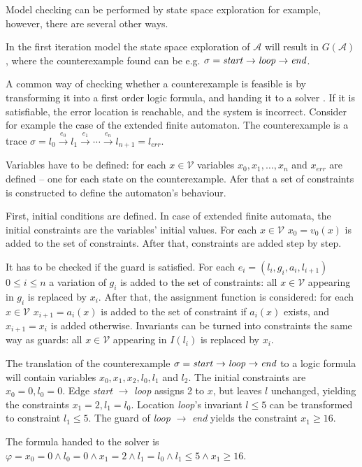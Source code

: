 Model checking can be performed by state space exploration for example, however, there are several other ways.

 \begin{example}
 	In the first iteration model the state space exploration of $\mathcal{A}$ will result in $G(\mathcal{A})$, where the counterexample found can be e.g. $\sigma = \text{\emph{start}} \to \text{\emph{loop}} \to \text{\emph{end}}$.
 \end{example}
 
 A common way of checking whether a counterexample  is feasible is by transforming it into a first order logic formula, and handing it to a solver \cite{BCCZ99}. If it is satisfiable, the error location is reachable, and the system is incorrect. Consider for example the case of the extended finite automaton. The counterexample is a trace $\sigma = l_0 \xrightarrow{e_0} l_1 \xrightarrow{e_1} \cdots \xrightarrow{e_n} l_{n+1}=l_{err}$.

Variables have to be defined: for each $x \in \mathcal{V}$ variables $x_0,x_1, \dots, x_n$ and $x_{err}$ are defined -- one for each state on the counterexample. Afer that a set of constraints is constructed to define the automaton's behaviour. 

First, initial conditions are defined. In case of extended finite automata, the initial constraints are the variables' initial values. For each $x \in \mathcal{V}$ $x_0=v_0(x)$ is added to the set of constraints. After that, constraints are added step by step. 

It has to be checked if the guard is satisfied. For each $e_i=(l_i,g_i,a_i,l_{i+1})$ $0 \leq i \leq n$ a variation of $g_i$ is added to the set of constraints: all $x \in \mathcal{V}$ appearing in $g_i$ is replaced by $x_i$. After that, the assignment function is considered: for each $x \in \mathcal{V}$ $x_{i+1}=a_i(x)$ is added to the set of constraint if $a_i(x)$ exists, and $x_{i+1}=x_i$ is added otherwise. Invariants can be turned into constraints the same way as guards: all $x \in \mathcal{V}$ appearing in $I(l_i)$ is replaced by $x_i$. 

\begin{example}
	The translation of the counterexample $\sigma = \text{\emph{start}} \to \text{\emph{loop}} \to \text{\emph{end}}$ to a logic formula will contain variables $x_0,x_1,x_2,l_0,l_1$ and $l_2$. The initial constraints are $x_0=0,l_0=0$. Edge \emph{start} $\to$ \emph{loop} assigns 2 to $x$, but leaves $l$ unchanged, yielding the constraints $x_1=2,l_1=l_0$. Location \emph{loop}'s invariant $l \leq 5$ can be transformed to constraint $l_1 \leq 5$. The guard of \emph{loop} $\to$ \emph{end} yields the constraint $x_1 \geq 16$.
	
	The formula handed to the solver is $\varphi = x_0=0 \wedge l_0=0 \wedge x_1=2 \wedge l_1=l_0 \wedge l_1 \leq 5 \wedge x_1 \geq 16$.
\end{example}

